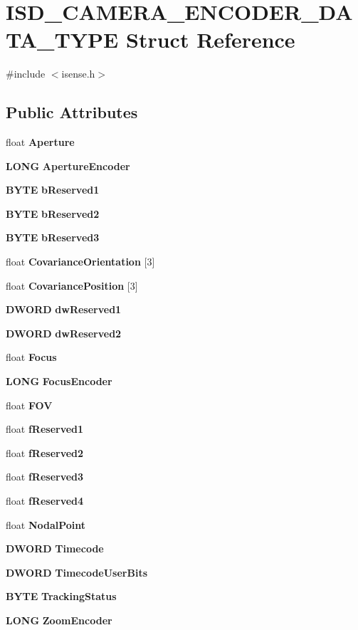 \section{\-I\-S\-D\-\_\-\-C\-A\-M\-E\-R\-A\-\_\-\-E\-N\-C\-O\-D\-E\-R\-\_\-\-D\-A\-T\-A\-\_\-\-T\-Y\-P\-E \-Struct \-Reference}
\label{structISD__CAMERA__ENCODER__DATA__TYPE}


{\ttfamily \#include $<$isense.\-h$>$}

\subsection*{\-Public \-Attributes}
\begin{DoxyCompactItemize}
\item 
float {\bf \-Aperture}
\item 
{\bf \-L\-O\-N\-G} {\bf \-Aperture\-Encoder}
\item 
{\bf \-B\-Y\-T\-E} {\bf b\-Reserved1}
\item 
{\bf \-B\-Y\-T\-E} {\bf b\-Reserved2}
\item 
{\bf \-B\-Y\-T\-E} {\bf b\-Reserved3}
\item 
float {\bf \-Covariance\-Orientation} [3]
\item 
float {\bf \-Covariance\-Position} [3]
\item 
{\bf \-D\-W\-O\-R\-D} {\bf dw\-Reserved1}
\item 
{\bf \-D\-W\-O\-R\-D} {\bf dw\-Reserved2}
\item 
float {\bf \-Focus}
\item 
{\bf \-L\-O\-N\-G} {\bf \-Focus\-Encoder}
\item 
float {\bf \-F\-O\-V}
\item 
float {\bf f\-Reserved1}
\item 
float {\bf f\-Reserved2}
\item 
float {\bf f\-Reserved3}
\item 
float {\bf f\-Reserved4}
\item 
float {\bf \-Nodal\-Point}
\item 
{\bf \-D\-W\-O\-R\-D} {\bf \-Timecode}
\item 
{\bf \-D\-W\-O\-R\-D} {\bf \-Timecode\-User\-Bits}
\item 
{\bf \-B\-Y\-T\-E} {\bf \-Tracking\-Status}
\item 
{\bf \-L\-O\-N\-G} {\bf \-Zoom\-Encoder}
\end{DoxyCompactItemize}


